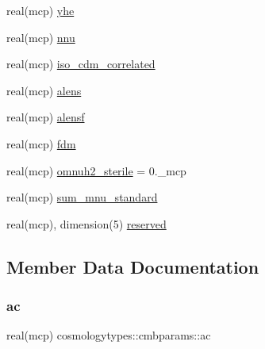 \begin{DoxyCompactItemize}
real(mcp) \mbox{\hyperlink{structcosmologytypes_1_1cmbparams_a82ecc8795b90c6563f58880df1447566}{yhe}}
\item 
real(mcp) \mbox{\hyperlink{structcosmologytypes_1_1cmbparams_a9e9b67be9f2c7233c7c0f36d9797b09f}{nnu}}
\item 
real(mcp) \mbox{\hyperlink{structcosmologytypes_1_1cmbparams_ad9a93759540a2c2639a74594c5a72e09}{iso\+\_\+cdm\+\_\+correlated}}
\item 
real(mcp) \mbox{\hyperlink{structcosmologytypes_1_1cmbparams_ac5ae628682d953ae24c5b0da8656e04f}{alens}}
\item 
real(mcp) \mbox{\hyperlink{structcosmologytypes_1_1cmbparams_a85ad4b438191d81a76873e6da23c0e34}{alensf}}
\item 
real(mcp) \mbox{\hyperlink{structcosmologytypes_1_1cmbparams_a5c38a3d94849c32a544012ad16d2ec2a}{fdm}}
\item 
real(mcp) \mbox{\hyperlink{structcosmologytypes_1_1cmbparams_a3c4d550d2f7e283ef410dfd2f53df9e9}{omnuh2\+\_\+sterile}} = 0.\+\_\+mcp
\item 
real(mcp) \mbox{\hyperlink{structcosmologytypes_1_1cmbparams_ae5e3c3e72d175db44ed627352ec37968}{sum\+\_\+mnu\+\_\+standard}}
\item 
real(mcp), dimension(5) \mbox{\hyperlink{structcosmologytypes_1_1cmbparams_a7cd987877f024ab9dc7286c694647980}{reserved}}
\end{DoxyCompactItemize}


\subsection{Member Data Documentation}
\mbox{\label{structcosmologytypes_1_1cmbparams_a980ce72f34393d750c1d374397ce5c94}} 
\subsubsection{\texorpdfstring{ac}{ac}}
{\footnotesize\ttfamily real(mcp) cosmologytypes\+::cmbparams\+::ac}

\mbox{\label{structcosmologytypes_1_1cmbparams_ac5ae628682d953ae24c5b0da8656e04f}} 
